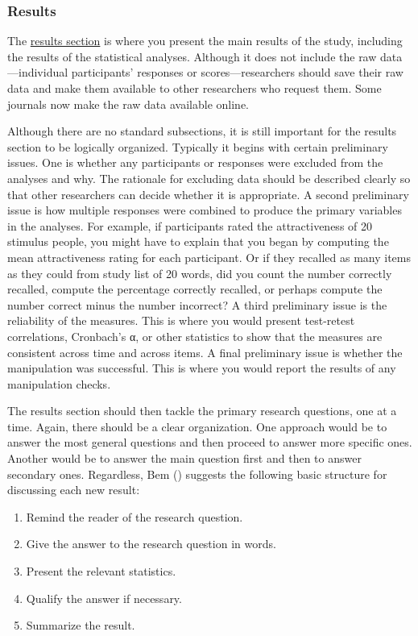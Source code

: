 \documentclass[
]{krantz}
\providecommand{\tightlist}{%
  \setlength{\itemsep}{0pt}\setlength{\parskip}{0pt}}
\begin{document}
\subsubsection*{Results}\label{results}


The \hyperref[results-section]{results section} is where you present the main results of the study, including the results of the statistical analyses. Although it does not include the raw data---individual participants' responses or scores---researchers should save their raw data and make them available to other researchers who request them. Some journals now make the raw data available online.

Although there are no standard subsections, it is still important for the results section to be logically organized. Typically it begins with certain preliminary issues. One is whether any participants or responses were excluded from the analyses and why. The rationale for excluding data should be described clearly so that other researchers can decide whether it is appropriate. A second preliminary issue is how multiple responses were combined to produce the primary variables in the analyses. For example, if participants rated the attractiveness of 20 stimulus people, you might have to explain that you began by computing the mean attractiveness rating for each participant. Or if they recalled as many items as they could from study list of 20 words, did you count the number correctly recalled, compute the percentage correctly recalled, or perhaps compute the number correct minus the number incorrect? A third preliminary issue is the reliability of the measures. This is where you would present test-retest correlations, Cronbach's α, or other statistics to show that the measures are consistent across time and across items. A final preliminary issue is whether the manipulation was successful. This is where you would report the results of any manipulation checks.

The results section should then tackle the primary research questions, one at a time. Again, there should be a clear organization. One approach would be to answer the most general questions and then proceed to answer more specific ones. Another would be to answer the main question first and then to answer secondary ones. Regardless, Bem () suggests the following basic structure for discussing each new result:

\begin{enumerate}
\def\labelenumi{\arabic{enumi}.}
\tightlist
\item
  Remind the reader of the research question.
\item
  Give the answer to the research question in words.
\item
  Present the relevant statistics.
\item
  Qualify the answer if necessary.
\item
  Summarize the result.
\end{enumerate}
\end{document}
